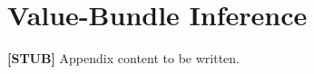 \chapter{Value-Bundle Inference}
\label{appc-value-bundle-inference}

\textbf{[STUB]} Appendix content to be written.
